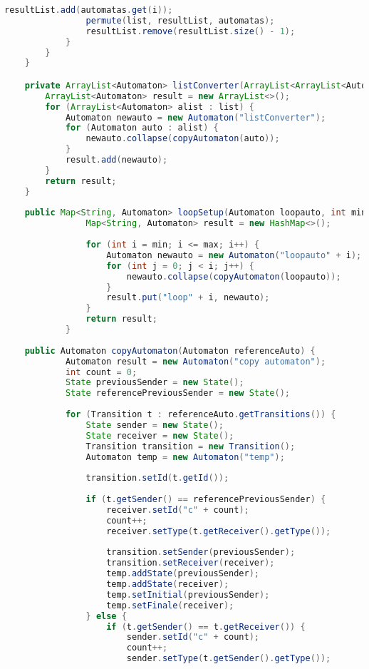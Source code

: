 \begin{lstlisting}[language=java, caption={\textit{Specification} osztály.},captionpos=b,label=specification_class]
                resultList.add(automatas.get(i));
                permute(list, resultList, automatas);
                resultList.remove(resultList.size() - 1);
            }
        }
    }

    private ArrayList<Automaton> listConverter(ArrayList<ArrayList<Automaton>> list) {
        ArrayList<Automaton> result = new ArrayList<>();
        for (ArrayList<Automaton> alist : list) {
            Automaton newauto = new Automaton("listConverter");
            for (Automaton auto : alist) {
                newauto.collapse(copyAutomaton(auto));
            }
            result.add(newauto);
        }
        return result;
    }
    
    public Map<String, Automaton> loopSetup(Automaton loopauto, int min, int max) {
	        	Map<String, Automaton> result = new HashMap<>();
	    	    
	            for (int i = min; i <= max; i++) {
	                Automaton newauto = new Automaton("loopauto" + i);
	                for (int j = 0; j < i; j++) {
	                    newauto.collapse(copyAutomaton(loopauto));
	                }
	                result.put("loop" + i, newauto);
	            }
	            return result;
	        }
    
    public Automaton copyAutomaton(Automaton referenceAuto) {
            Automaton result = new Automaton("copy automaton");
            int count = 0;
            State previousSender = new State();
            State referencePreviousSender = new State();
    
            for (Transition t : referenceAuto.getTransitions()) {
                State sender = new State();
                State receiver = new State();
                Transition transition = new Transition();
                Automaton temp = new Automaton("temp");
    
                transition.setId(t.getId());
    
                if (t.getSender() == referencePreviousSender) {
                    receiver.setId("c" + count);
                    count++;
                    receiver.setType(t.getReceiver().getType());
    
                    transition.setSender(previousSender);
                    transition.setReceiver(receiver);
                    temp.addState(previousSender);
                    temp.addState(receiver);
                    temp.setInitial(previousSender);
                    temp.setFinale(receiver);
                } else {
                    if (t.getSender() == t.getReceiver()) {
                        sender.setId("c" + count);
                        count++;
                        sender.setType(t.getSender().getType());
    

\end{lstlisting}

